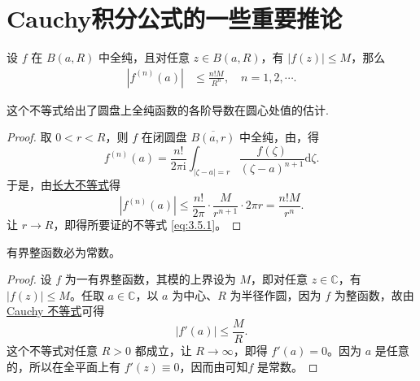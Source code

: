 \documentclass[../../main.tex]{subfiles}%
\begin{document}
\section{Cauchy积分公式的一些重要推论}

\begin{theorem}[Cauchy不等式]\label{theorem:Cauchy不等式(离散版)-复变函数}
设 \( f \) 在 \( B(a,R) \) 中全纯，且对任意 \( z \in B(a,R) \)，有 \( |f(z)| \leqslant M \)，那么
\begin{align}
|f^{(n)}(a)| &\leqslant \frac{n!M}{R^n}, \quad n = 1,2,\cdots. \label{eq:3.5.1}
\end{align}
\end{theorem}
\begin{note}
这个不等式给出了圆盘上全纯函数的各阶导数在圆心处值的估计.
\end{note}
\begin{proof}
取 \( 0 < r < R \)，则 \( f \) 在闭圆盘 \( \overline{B(a,r)} \) 中全纯，由，得
\[
f^{(n)}(a) = \frac{n!}{2\pi \mathrm{i}} \int_{|\zeta - a| = r} \frac{f(\zeta)}{(\zeta - a)^{n + 1}} \mathrm{d}\zeta.
\]
于是，由\hyperref[theorem:长大不等式]{长大不等式}得
\[
|f^{(n)}(a)| \leqslant \frac{n!}{2\pi} \cdot \frac{M}{r^{n + 1}} \cdot 2\pi r = \frac{n!M}{r^n}.
\]
让 \( r \to R \)，即得所要证的不等式 \eqref{eq:3.5.1}。
\end{proof}

\begin{theorem}[Liouville定理]\label{theorem:Liouville(刘维尔)定理}
有界整函数必为常数。
\end{theorem}
\begin{proof}
设 \( f \) 为一有界整函数，其模的上界设为 \( M \)，即对任意 \( z \in \mathbb{C} \)，有 \( |f(z)| \leqslant M \)。任取 \( a \in \mathbb{C} \)，以 \( a \) 为中心、\( R \) 为半径作圆，因为 \( f \) 为整函数，故由 \hyperref[theorem:Cauchy不等式(离散版)-复变函数]{Cauchy 不等式}可得
\[
|f'(a)| \leqslant \frac{M}{R}.
\]
这个不等式对任意 \( R > 0 \) 都成立，让 \( R \to \infty \)，即得 \( f'(a) = 0 \)。因为 \( a \) 是任意的，所以在全平面上有 \( f'(z) \equiv 0 \)，因而由可知\( f \) 是常数。
\end{proof}
\end{document}
